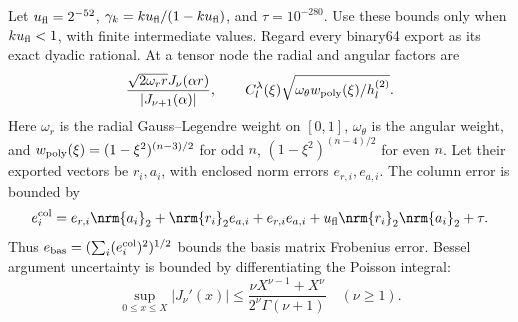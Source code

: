 Let $u_{\rm fl}=2^{-52}$,
$\gamma_k=ku_{\rm fl}/(1-ku_{\rm fl})$, and $\tau=10^{-280}$.
Use these bounds only when $ku_{\rm fl}<1$, with finite intermediate
values. Regard every binary64 export as its exact dyadic rational.
At a tensor node the radial and angular factors are
\[
 \frac{\sqrt{2\omega_rr}J_\nu(\alpha r)}{|J_{\nu+1}(\alpha)|},
 \qquad
 C_l^\lambda(\xi)
 \sqrt{\omega_\theta w_{\rm poly}(\xi)/h_l^{(2)}}.
\]
Here $\omega_r$ is the radial Gauss--Legendre weight on $[0,1]$,
$\omega_\theta$ is the angular weight, and
$w_{\rm poly}(\xi)=(1-\xi^2)^{(n-3)/2}$ for odd $n$,
$(1-\xi^2)^{(n-4)/2}$ for even $n$.
Let their exported vectors be $r_i,a_i$, with enclosed norm errors
$e_{r,i},e_{a,i}$. The column error is bounded by
\begin{equation}\label{gd:eq:tensor-error}
 e_i^{\rm col}=e_{r,i}\nrm{a_i}_2+\nrm{r_i}_2e_{a,i}
              +e_{r,i}e_{a,i}
              +u_{\rm fl}\nrm{r_i}_2\nrm{a_i}_2+\tau .
\end{equation}
Thus $e_{\rm bas}=(\sum_i(e_i^{\rm col})^2)^{1/2}$
bounds the basis matrix Frobenius error.
Bessel argument uncertainty is bounded by differentiating the Poisson
integral:
\[
 \sup_{0\le x\le X}|J_\nu'(x)|
 \le\frac{\nu X^{\nu-1}+X^\nu}{2^\nu\Gamma(\nu+1)}
 \quad(\nu\ge1).
\]

